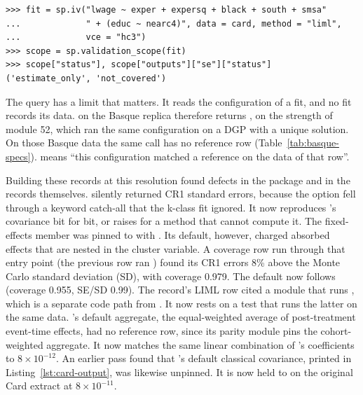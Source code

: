 \begin{lstlisting}[caption={Output-level scope of a LIML fit of the Card
model with HC3 errors. The \proglang{Stata} reference rows pin the LIML
coefficient and its classical, HC1, and CR1 errors, so the estimate is
covered and the HC3 standard error is not.},label={lst:scope},captionpos=b]
>>> fit = sp.iv("lwage ~ exper + expersq + black + south + smsa"
...             " + (educ ~ nearc4)", data = card, method = "liml",
...             vce = "hc3")
>>> scope = sp.validation_scope(fit)
>>> scope["status"], scope["outputs"]["se"]["status"]
('estimate_only', 'not_covered')
\end{lstlisting}

The query has a limit that matters. It reads the configuration of a fit,
and no fit records its data.  on the
Basque replica therefore returns , on the strength of module
52, which ran the same configuration on a DGP with a unique solution. On
those Basque data the same call has no reference row
(Table~\ref{tab:basque-specs}).  means ``this configuration
matched a reference on the data of that row''.

Building these records at this resolution found defects in the package and in
the records themselves.  silently
returned CR1 standard errors, because the option fell through a keyword
catch-all that the k-class fit ignored. It now reproduces
's covariance bit for bit, or raises for a method that
cannot compute it. The fixed-effects member  was
pinned to  with . Its default, however,
charged absorbed effects that are nested in the cluster variable. A
coverage row run through that entry point (the previous row ran
) found its CR1 errors 8\% above the Monte Carlo standard deviation
(SD), with
coverage 0.979. The default now follows  (coverage 0.955,
SE/SD 0.99).
The record's LIML row cited a module that runs , which is a
separate code path from . It now rests on a
test that runs the latter on the same data. 's
default aggregate, the equal-weighted average of post-treatment
event-time effects, had no reference row, since its parity module pins the
cohort-weighted aggregate. It now matches the same linear combination of
's coefficients to \(8\times10^{-12}\). An earlier pass found that 's default classical covariance, printed
in Listing~\ref{lst:card-output}, was likewise unpinned. It is now held
to  on the original Card extract at
\(8\times10^{-11}\).

